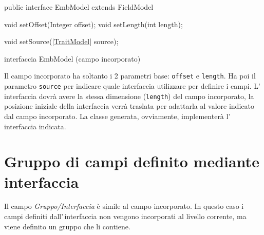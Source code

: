 \documentclass[a4paper,10pt]{report}
\newif\ifesource
\newenvironment{elisting}[1][H]
  {\captionsetup{aboveskip=0pt}\begin{listing}[#1]}
  {\end{listing}%
}
\begin{document}
\ifesource
\begin{figure*}[!htb]
\begin{lstlisting}[language=java, 
caption=interfaccia EmbModel (campo incorporato), 
label=lst:EmbModel]
public interface EmbModel extends FieldModel {
    void setOffset(Integer offset);
    void setLength(int length);
    
    void setSource((*\hyperref[lst:TraitModel]{TraitModel}*) source);
}
\end{lstlisting}\index{EmbModel}
\end{figure*}
\else
\begin{elisting}[!htb]
\begin{javacode}
public interface EmbModel extends FieldModel {
    void setOffset(Integer offset);
    void setLength(int length);
    
    void setSource(|\hyperref[lst:TraitModel]{TraitModel}| source);
}
\end{javacode}
\caption{interfaccia EmbModel (campo incorporato)}
\label{lst:EmbModel}
\end{elisting}
\fi
Il campo incorporato ha soltanto i 2 parametri base: \verb!offset! e 
\verb!length!.
Ha poi il parametro \verb!source! per indicare quale interfaccia utilizzare per
definire i campi. L'\,interfaccia dovrà avere la stessa dimensione 
(\verb!length!) del campo incorporato, la posizione iniziale della interfaccia
verrà traslata per adattarla al valore indicato dal campo incorporato.
La classe generata, ovviamente, implementerà l'\,interfaccia indicata.

\section{Gruppo di campi definito mediante interfaccia} 
Il campo \textsl{Gruppo/Interfaccia} è simile al campo incorporato.
In questo caso i campi definiti dall'\,interfaccia non vengono incorporati al
livello corrente, ma viene definito un gruppo che li contiene.
\end{document}
